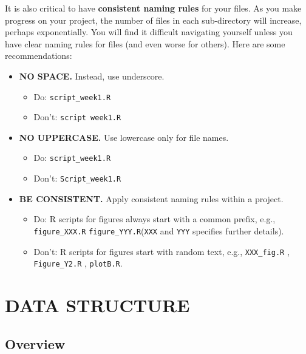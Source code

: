 \documentclass[
]{book}
\providecommand{\tightlist}{%
  \setlength{\itemsep}{0pt}\setlength{\parskip}{0pt}}
\begin{document}
It is also critical to have \textbf{consistent naming rules} for your files. As you make progress on your project, the number of files in each sub-directory will increase, perhaps exponentially. You will find it difficult navigating yourself unless you have clear naming rules for files (and even worse for others). Here are some recommendations:

\begin{itemize}
\tightlist
\item
  \textbf{NO SPACE.} Instead, use underscore.

  \begin{itemize}
  \tightlist
  \item
    Do: \texttt{script\_week1.R}
  \item
    Don't: \texttt{script\ week1.R}
  \end{itemize}
\item
  \textbf{NO UPPERCASE.} Use lowercase only for file names.

  \begin{itemize}
  \tightlist
  \item
    Do: \texttt{script\_week1.R}
  \item
    Don't: \texttt{Script\_week1.R}
  \end{itemize}
\item
  \textbf{BE CONSISTENT.} Apply consistent naming rules within a project.

  \begin{itemize}
  \tightlist
  \item
    Do: R scripts for figures always start with a common prefix, e.g., \texttt{figure\_XXX.R} \texttt{figure\_YYY.R}(\texttt{XXX} and \texttt{YYY} specifies further details).
  \item
    Don't: R scripts for figures start with random text, e.g., \texttt{XXX\_fig.R} , \texttt{Figure\_Y2.R} , \texttt{plotB.R}.
  \end{itemize}
\end{itemize}

\hypertarget{data-structure}{%
\chapter{DATA STRUCTURE}\label{data-structure}}

\hypertarget{overview}{%
\section{Overview}\label{overview}}
\end{document}
